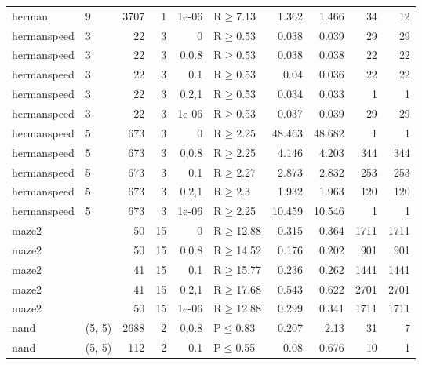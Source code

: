 \begin{longtable}{llrrrlrrrr}
 herman        & 9        &   	3707 &   1 & 1e-06 & R$\geq$7.13  & 1.362   & 1.466   & 34      & 12   \\
 hermanspeed   & 3        &     	22 &   3 & 0     & R$\geq$0.53  & 0.038   & 0.039   & 29      & 29   \\
 hermanspeed   & 3        &     	22 &   3 & 0,0.8 & R$\geq$0.53  & 0.038   & 0.038   & 22      & 22   \\
 hermanspeed   & 3        &     	22 &   3 & 0.1   & R$\geq$0.53  & 0.04    & 0.036   & 22      & 22   \\
 hermanspeed   & 3        &     	22 &   3 & 0.2,1 & R$\geq$0.53  & 0.034   & 0.033   & 1       & 1    \\
 hermanspeed   & 3        &     	22 &   3 & 1e-06 & R$\geq$0.53  & 0.037   & 0.039   & 29      & 29   \\
 hermanspeed   & 5        &    	673 &   3 & 0     & R$\geq$2.25  & 48.463  & 48.682  & 1       & 1    \\
 hermanspeed   & 5        &    	673 &   3 & 0,0.8 & R$\geq$2.25  & 4.146   & 4.203   & 344     & 344  \\
 hermanspeed   & 5        &    	673 &   3 & 0.1   & R$\geq$2.27  & 2.873   & 2.832   & 253     & 253  \\
 hermanspeed   & 5        &    	673 &   3 & 0.2,1 & R$\geq$2.3   & 1.932   & 1.963   & 120     & 120  \\
 hermanspeed   & 5        &    	673 &   3 & 1e-06 & R$\geq$2.25  & 10.459  & 10.546  & 1       & 1    \\
 maze2         &          &     	50 &  15 & 0     & R$\geq$12.88 & 0.315   & 0.364   & 1711    & 1711 \\
 maze2         &          &     	50 &  15 & 0,0.8 & R$\geq$14.52 & 0.176   & 0.202   & 901     & 901  \\
 maze2         &          &     	41 &  15 & 0.1   & R$\geq$15.77 & 0.236   & 0.262   & 1441    & 1441 \\
 maze2         &          &     	41 &  15 & 0.2,1 & R$\geq$17.68 & 0.543   & 0.622   & 2701    & 2701 \\
 maze2         &          &     	50 &  15 & 1e-06 & R$\geq$12.88 & 0.299   & 0.341   & 1711    & 1711 \\
 nand          & (5, 5)   &   	2688 &   2 & 0,0.8 & P$\leq$0.83  & 0.207   & 2.13    & 31      & 7    \\
 nand          & (5, 5)   &    	112 &   2 & 0.1   & P$\leq$0.55  & 0.08    & 0.676   & 10      & 1    \\

\end{longtable}
